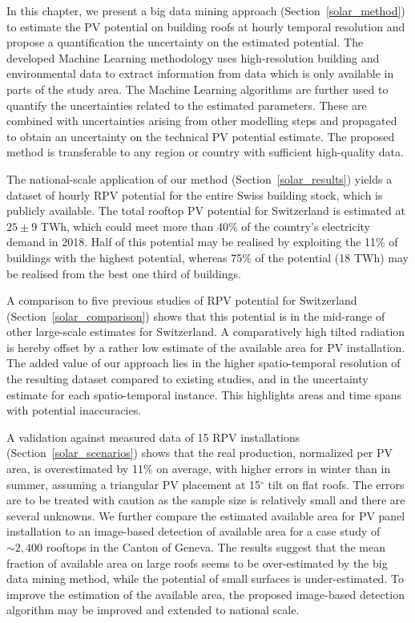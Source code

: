 In this chapter, we present a big data mining approach (Section~\ref{solar_method}) to estimate the PV potential on building roofs at hourly temporal resolution and propose a quantification the uncertainty on the estimated potential. 
The developed Machine Learning methodology uses high-resolution building and environmental data to extract information from data which is only available in parts of the study area.
%
The Machine Learning algorithms are further used to quantify the uncertainties related to the estimated parameters. These are combined with uncertainties arising from other modelling steps and propagated to obtain an uncertainty on the technical PV potential estimate. 
The proposed %
method is transferable to any region or country with sufficient high-quality data.

The national-scale application of our method (Section~\ref{solar_results}) yields a dataset of hourly RPV potential for the entire Swiss building stock, which is publicly available.
The total rooftop PV potential for Switzerland is estimated at $25\pm9$ TWh, which could meet more than 40\% of the country's electricity demand in 2018. 
Half of this potential may be realised by exploiting the 11\% of buildings with the highest potential, whereas 75\% of the potential (18 TWh) may be realised from the best one third of buildings. 

A comparison to five previous studies of RPV potential for Switzerland (Section~\ref{solar_comparison}) shows that this potential is in the mid-range of other large-scale estimates for Switzerland.
A comparatively high tilted radiation is hereby offset by a rather low estimate of the available area for PV installation.
The added value of our approach lies in the higher spatio-temporal resolution of the resulting dataset compared to existing studies, and in the uncertainty estimate for each spatio-temporal instance.
This highlights areas and time spans with potential inaccuracies. 

A validation against measured data of 15 RPV installations (Section~\ref{solar_scenarios}) shows that the real production, normalized per PV area, is overestimated by 11\% on average, with higher errors in winter than in summer, assuming a triangular PV placement at 15$^\circ$ tilt on flat roofs.
The errors are to be treated with caution as the sample size is relatively small and there are several unknowns.
We further compare the estimated available area for PV panel installation to an image-based detection of available area for a case study of $\sim 2,400$ rooftops in the Canton of Geneva. 
The results suggest that the mean fraction of available area on large roofs seems to be over-estimated by the big data mining method, while the potential of small surfaces is under-estimated. 
To improve the estimation of the available area, the proposed image-based detection algorithm may be improved and extended to national scale. 

